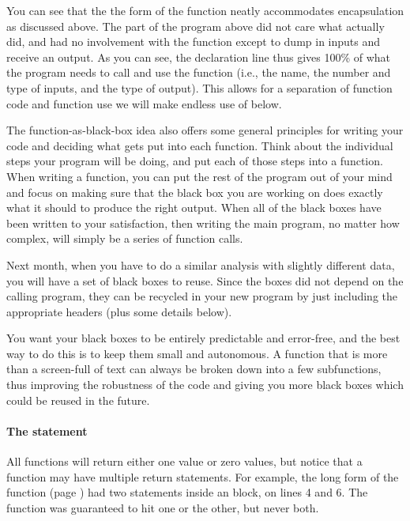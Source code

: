 \documentclass[12pt]{article}
\begin{document}
You can see that the the form of the function neatly accommodates
encapsulation as discussed above.  
The  part of the program above did not care what
 actually did, and had no involvement with the
function except to dump in inputs and receive an output. As you can see,
the declaration line thus gives 100\% of what the program needs to call
and use the function (i.e., the name, the number and type of inputs,
and the type of output). This allows for a separation of function code
and function use we will make endless use of below.

The function-as-black-box idea also offers some general principles for
writing your code and deciding what gets put into each function. Think
about the individual steps your program will be doing, and put each
of those steps into a function. When writing a function, you
can put the rest of the program out of your mind and focus on making
sure that the black box you are working on does exactly what it should
to produce the right output. When all of the black boxes have been written to
your satisfaction, then writing the main program, no matter how complex,
will simply be a series of function calls.

Next month, when you have to do a similar analysis with slightly different
data, you will have a set of black boxes to reuse. Since the boxes did not
depend on the calling program, they can be recycled in your new program
by just including the appropriate headers (plus some details below).

You want your black boxes to be entirely predictable and error-free,
and the best way to do this is to keep them small and autonomous. A
function that is more than a screen-full of text can always be broken
down into a few subfunctions, thus improving the robustness of the code
and giving you more black boxes which could be reused in the future.

\paragraph{\treesymbol{} The  statement} 
All functions will return
either one value or zero values, but notice that a function may have
multiple return statements. For example, the long form of the
 function (page \pageref{isevenfn}) had two  statements inside
an  block, on lines 4 and 6. The function was guaranteed
to hit one or the other, but never both.
\end{document}
